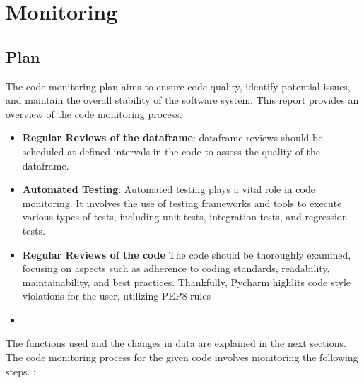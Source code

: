 %
%




\chapter{Monitoring}


\section{Plan}

The code monitoring plan aims to ensure code quality, identify potential issues, and maintain the overall stability of the software system. This report provides an overview of the code monitoring process.

\begin{itemize}
	\item \textbf{Regular Reviews of the dataframe}: dataframe reviews should be scheduled at defined intervals in the code to assess the quality of the dataframe. 
	
	\item \textbf{Automated Testing}: Automated testing plays a vital role in code monitoring. It involves the use of testing frameworks and tools to execute various types of tests, including unit tests, integration tests, and regression tests.
	
	\item \textbf{Regular Reviews of the code} The code should be thoroughly examined, focusing on aspects such as adherence to coding standards, readability, maintainability, and best practices. Thankfully, Pycharm highlits code style violations for the user, utilizing PEP8 rules 
	
	\item
\end{itemize}



The functions used and the changes in data are explained in the next sections. The code monitoring process for the given code involves monitoring the following steps. :


